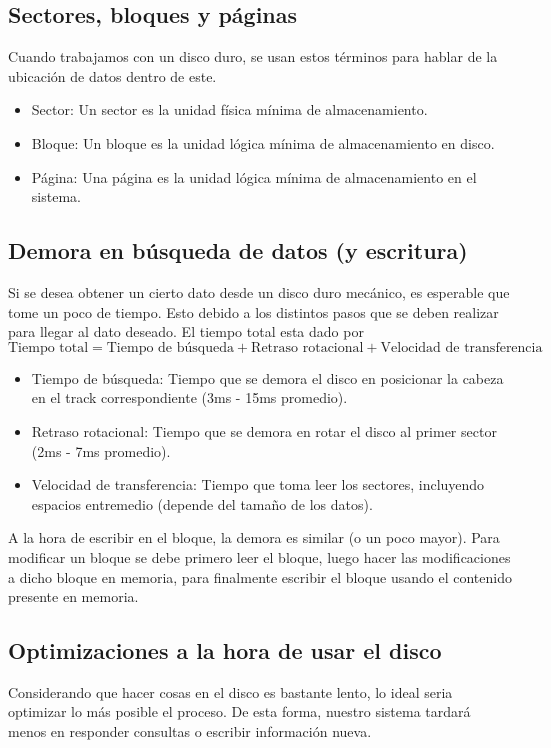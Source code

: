 \subsection{Sectores, bloques y páginas}
Cuando trabajamos con un disco duro, se usan estos términos para hablar de la ubicación de datos dentro de este.
\begin{itemize}
  \item Sector: Un sector es la unidad física mínima de almacenamiento.
  \item Bloque: Un bloque es la unidad lógica mínima de almacenamiento en disco.
  \item Página: Una página es la unidad lógica mínima de almacenamiento en el sistema.
\end{itemize}

\subsection{Demora en búsqueda de datos (y escritura)}
Si se desea obtener un cierto dato desde un disco duro mecánico, es esperable que tome un poco de tiempo. Esto debido a los distintos pasos que se deben realizar para llegar al dato deseado. El tiempo total esta dado por
\[ \text{Tiempo total} = \text{Tiempo de búsqueda} + \text{Retraso rotacional} + \text{Velocidad de transferencia} \]

\begin{itemize}
  \item Tiempo de búsqueda: Tiempo que se demora el disco en posicionar la cabeza en el track correspondiente (3ms - 15ms promedio).
  \item Retraso rotacional: Tiempo que se demora en rotar el disco al primer sector (2ms - 7ms promedio).
  \item Velocidad de transferencia: Tiempo que toma leer los sectores, incluyendo espacios entremedio (depende del tamaño de los datos).
\end{itemize}

A la hora de escribir en el bloque, la demora es similar (o un poco mayor). Para modificar un bloque se debe primero leer el bloque, luego hacer las modificaciones a dicho bloque en memoria, para finalmente escribir el bloque usando el contenido presente en memoria.


\subsection{Optimizaciones a la hora de usar el disco}
Considerando que hacer cosas en el disco es bastante lento, lo ideal seria optimizar lo más posible el proceso. De esta forma, nuestro sistema tardará menos en responder consultas o escribir información nueva.



